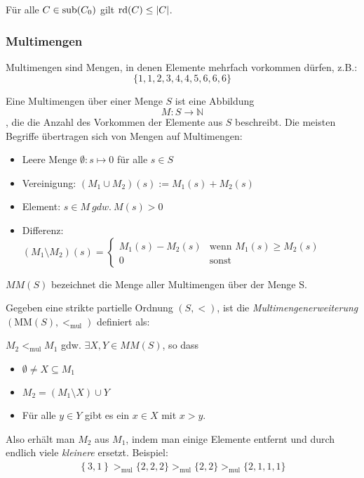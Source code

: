 \begin{lemma}
Für alle $C \in \sub\left( C_{0} \right)$ gilt
$\rd\left( C \right) \leq \left| C \right|$.
\end{lemma}

\subsubsection{Multimengen}\label{multimengen}

Multimengen sind Mengen, in denen Elemente mehrfach vorkommen dürfen, z.B.:
$$\{1,1,2,3,4,4,5,6,6,6\}$$

Eine Multimengen über einer Menge $S$ ist eine Abbildung
$$M:S\rightarrow\mathbb{N}$$, die die Anzahl des Vorkommen der Elemente aus
$S$ beschreibt.  Die meisten Begriffe übertragen sich von Mengen auf
Multimengen:

\begin{itemize}
	\item Leere Menge $\emptyset: s \mapsto 0$ für alle $s \in S$
	\item Vereinigung: $(M_1 \cup M_2)(s) := M_1(s) + M_2(s)$ 
	\item Element: $s \in M\ gdw.\ M(s)>0$
    \item Differenz: $(M_1 \setminus M_2)(s) =
        \begin{cases}
                M_1(s) - M_2(s) & \text{wenn } M_1(s) \geq M_2(s)\\
                0 & \text{sonst}
        \end{cases}$
\end{itemize}

$MM(S)$ bezeichnet die Menge aller Multimengen über der Menge S.

Gegeben eine strikte partielle Ordnung $\left( S, < \right)$, ist die
\emph{Multimengenerweiterung} $\left( \text{MM}\left( S \right), <_{\text{mul}} \right)$ definiert als: 

$M_2 <_{\text{mul}}M_1$ gdw. $\exists X,Y \in MM(S)$, so dass

\begin{itemize}
\item
  $\emptyset \neq X \subseteq M_1$
\item
  $M_2 = \left( M_1 \setminus X \right) \cup Y$
\item
    Für alle $y \in Y$ gibt es ein $x \in X$ mit $x > y$.
\end{itemize}

Also erhält man $M_2$ aus $M_1$, indem man einige Elemente entfernt und durch endlich viele \emph{kleinere} ersetzt.
Beispiel:
\begin{align*}
\left\{ 3,1 \right\} >_{\text{mul}}\{ 2,2,2\} >_{\text{mul}}\{ 2,2\} >_{\text{mul}}\{ 2,1,1,1\}
\end{align*}

